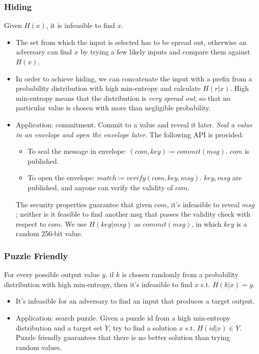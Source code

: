 \subsubsection{Hiding}
Given $H(x)$, it is infeasible to find $x$.
\begin{itemize}
  \item The set from which the input is selected has to be spread out, otherwise an adversary can find $x$ by trying a few likely inputs and compare them against $H(x)$.
  \item In order to achieve hiding, we can concatenate the input with a prefix from a probability distribution with high min-entropy and calculate $H(r|x)$. High min-entropy means that the distribution is \textit{very spread out}, so that no particular value is chosen with more than negligible probability.
  \item Application: commitment. Commit to a value and reveal it later. \textit{Seal a value in an envelope and open the envelope later}. The following API is provided:
  \begin{itemize}
    \item To seal the message in envelope: $(com, key)\coloneqq commit(msg)$. $com$ is published. 
    \item To open the envelope: $match\coloneqq verify(com, key, msg)$. $key, msg$ are published, and anyone can verify the validity of $com$.
  \end{itemize}
  The security properties guarantee that given $com$, it's infeasible to reveal $msg$; neither is it feasible to find another msg that passes the validity check with respect to $com$. We use $H(key|msg)$ as $commit(msg)$, in which $key$ is a random 256-bit value.
\end{itemize}
\subsubsection{Puzzle Friendly}
For every possible output value $y$, if $k$ is chosen randomly from a probability distribution with high min-entropy, then it's infeasible to find $x$ s.t. $H(k|x)=y$.
\begin{itemize}
  \item It's infeasible for an adversary to find an input that produces a target output.
  \item Application: search puzzle. Given a puzzle id from a high min-entropy distribution and a target set $Y$, try to find a solution $x$ s.t. $H(id|x)\in Y$. Puzzle friendly guarantees that there is no better solution than trying random values.
\end{itemize}
